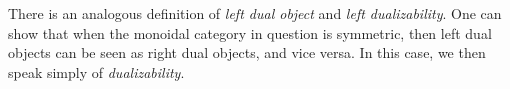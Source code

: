 \begin{remark}
    There is an analogous definition of \emph{left dual object} and \emph{left dualizability}.
    One can show that when the monoidal category in question is symmetric, then left dual objects can be seen as right dual objects, and vice versa.
    In this case, we then speak simply of \emph{dualizability}.
\end{remark}

%
%
%
%
%
%
%
%
%
%
%
%
%

